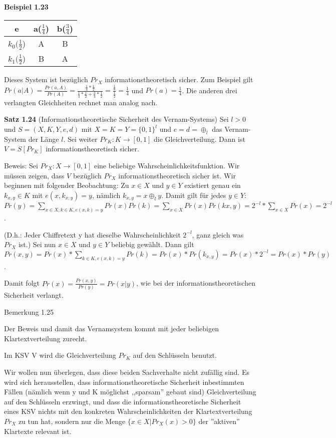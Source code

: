 \documentclass[a4paper]{article}
\begin{document}
\begin{multicols}{3}
    \textbf{Beispiel 1.23}
    \begin{tabular}{c|c|c}
     e         & a($\frac{1}{4}$) & b($\frac{3}{4}$) \\\hline
     $k_0(\frac{1}{2}$) & A        & B        \\
     $k_1(\frac{1}{2}$) & B        & A        
    \end{tabular}

    Dieses System ist bezüglich $Pr_X$ informationstheoretisch sicher. Zum Beispiel gilt $Pr(a|A) =\frac{Pr(a,A)}{Pr(A)}=\frac{\frac{1}{4}*\frac{1}{2}}{\frac{1}{4}*\frac{1}{2}+\frac{3}{4}*\frac{1}{2}}=\frac{\frac{1}{8}}{\frac{1}{2}}=\frac{1}{4}$ und $Pr(a)=\frac{1}{4}$. Die anderen drei verlangten Gleichheiten rechnet man analog nach.

    \textbf{Satz 1.24} (Informationstheoretische Sicherheit des Vernam-Systems) Sei $l>0$ und $S=(X,K,Y,e,d)$ mit $X=K=Y=\{0,1\}^l$ und $e=d=\oplus_l$ das Vernam-System der Länge $l$. Sei weiter $Pr_K:K\rightarrow [0,1]$ die Gleichverteilung. Dann ist $V=S[Pr_K]$ informationstheoretisch sicher.

    Beweis: Sei $Pr_X:X\rightarrow [0,1]$ eine beliebige Wahrscheinlichkeitsfunktion. Wir müssen zeigen, dass $V$ bezüglich $Pr_X$ informationstheoretisch sicher ist. Wir beginnen mit folgender Beobachtung: Zu $x\in X$ und $y\in Y$ existiert genau ein $k_{x,y}\in K$ mit $e(x,k_{x,y})=y$, nämlich $k_{x,y}=x\oplus_l y$. Damit gilt für jedes $y\in Y$: $Pr(y)=\sum_{x\in X,k\in K,e(x,k)=y} Pr(x)Pr(k) = \sum_{x\in X} Pr(x) Pr(kx,y)= 2^{-l}* \sum_{x\in X} Pr(x)=2^{-l}$.

    (D.h.: Jeder Chiffretext y hat dieselbe Wahrscheinlichkeit $2^{-l}$, ganz gleich was $Pr_X$ ist.)
    Sei nun $x\in X$ und $y\in Y$ beliebig gewählt. Dann gilt $Pr(x,y) = Pr(x)*\sum_{k\in K, e(x,k)=y} Pr(k) = Pr(x)*Pr(k_{x,y}) = Pr(x)* 2^{-l}= Pr(x)*Pr(y)$.

    Damit folgt $Pr(x)=\frac{Pr(x,y)}{Pr(y)}= Pr(x|y)$, wie bei der informationstheoretischen Sicherheit verlangt.

    Bemerkung 1.25
    \begin{enumerate*}
        \item Der Beweis und damit das Vernamsystem kommt mit jeder beliebigen Klartextverteilung zurecht.
        \item Im KSV V wird die Gleichverteilung $Pr_K$ auf den Schlüsseln benutzt.
    \end{enumerate*}

    Wir wollen nun überlegen, dass diese beiden Sachverhalte nicht zufällig sind. Es wird sich herausstellen, dass informationstheoretische Sicherheit inbestimmten Fällen (nämlich wenn y und K möglichst ,,sparsam'' gebaut sind) Gleichverteilung auf den Schlüsseln erzwingt, und dass die informationstheoretische Sicherheit eines KSV nichts mit den konkreten Wahrscheinlichkeiten der Klartextverteilung $Pr_X$ zu tun hat, sondern nur die Menge $\{x\in X|Pr_X(x)> 0\}$ der ''aktiven'' Klartexte relevant ist.


\end{multicols}
\end{document}
